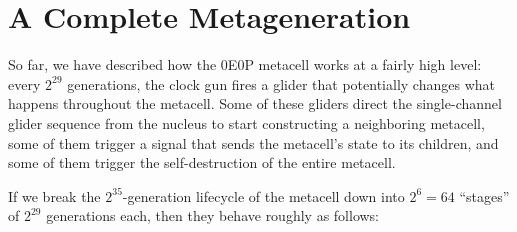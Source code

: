 

\section{A Complete Metageneration}\label{sec:0e0p_timeline}

So far, we have described how the 0E0P metacell works at a fairly high level: every $2^{29}$ generations, the clock gun fires a glider that potentially changes what happens throughout the metacell. Some of these gliders direct the single-channel glider sequence from the nucleus to start constructing a neighboring metacell, some of them trigger a signal that sends the metacell's state to its children, and some of them trigger the self-destruction of the entire metacell.

If we break the $2^{35}$-generation lifecycle of the metacell down into $2^6 = 64$ ``stages'' of $2^{29}$ generations each, then they behave roughly as follows:\smallskip

